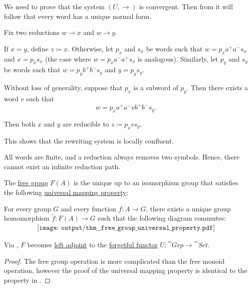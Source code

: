 \begin{defproof}
  We need to prove that the system \( (U, \to) \) is convergent. Then from  it will follow that every word has a unique normal form.

   Fix two reductions \( w \to x \) and \( w \to y \).

  If \( x = y \), define \( z \coloneqq x \). Otherwise, let \( p_x \) and \( s_x \) be words such that \( w = p_x a^+ a^- s_x \) and \( x = p_x s_x \) (the case where \( w = p_x a^- a^+ s_x \) is analogous). Similarly, let \( p_y \) and \( s_y \) be words such that \( w = p_y b^+ b^- s_y \) and \( y = p_y s_y \).

  Without loss of generality, suppose that \( p_x \) is a subword of \( p_y \). Then there exists a word \( v \) such that
  \begin{equation*}
    w = p_x a^+ a^- v b^+ b^- s_y.
  \end{equation*}

  Then both \( x \) and \( y \) are reducible to \( z \coloneqq p_x v s_y \).

  This shows that the rewriting system is locally confluent.

   All words are finite, and a reduction always removes two symbols. Hence, there cannot exist an infinite reduction path.
\end{defproof}

\begin{proposition}\label{thm:free_group_universal_property}
  The \hyperref[def:free_group]{free group} \( F(A) \) is the unique up to an isomorphism group that satisfies the following \hyperref[rem:universal_mapping_property]{universal mapping property}:
  \begin{displayquote}
    For every group \( G \) and every function \( f: A \to G \), there exists a unique group homomorphism \( \widetilde{f}: F(A) \to G \) such that the following diagram commutes:
    \begin{equation}\label{eq:thm:free_group_universal_property/diagram}
      \begin{aligned}
        \texttt{[image: output/thm\_\_free\_group\_universal\_property.pdf]}
      \end{aligned}
    \end{equation}
  \end{displayquote}

  Via , \( F \) becomes \hyperref[def:category_adjunction]{left adjoint} to the \hyperref[def:concrete_category]{forgetful functor} \( U: \cat{Grp} \to \cat{Set} \).
\end{proposition}
\begin{proof}
  The free group operation is more complicated than the free monoid operation, however the proof of the universal mapping property is identical to the property in .
\end{proof}

